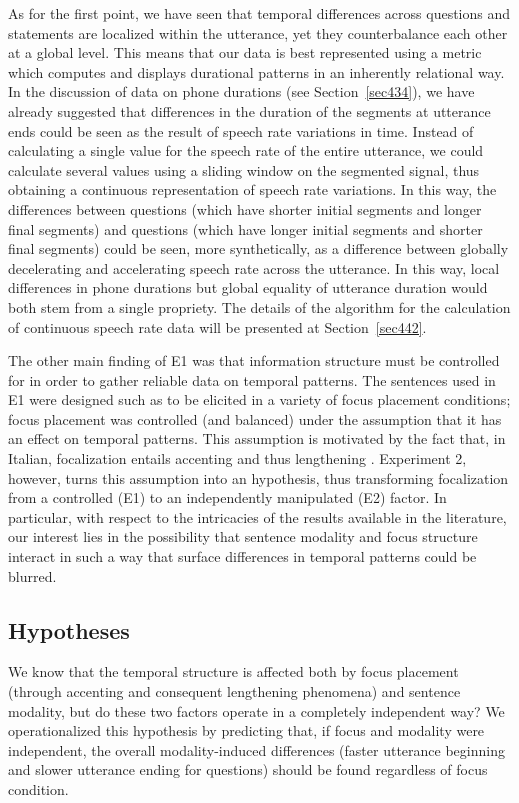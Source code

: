 As for the first point, we have seen that temporal differences across questions and statements are localized within the utterance, yet they counterbalance each other at a global level. This means that our data is best represented using a metric which computes and displays durational patterns in an inherently relational way. In the discussion of data on phone durations (see Section~\ref{sec434}), we have already suggested that differences in the duration of the segments at utterance ends could be seen as the result of speech rate variations in time. Instead of calculating a single value for the speech rate of the entire utterance, we could calculate several values using a sliding window on the segmented signal, thus obtaining a continuous representation of speech rate variations. In this way, the differences between questions (which have shorter initial segments and longer final segments) and questions (which have longer initial segments and shorter final segments) could be seen, more synthetically, as a difference between globally decelerating and accelerating speech rate across the utterance. In this way, local differences in phone durations but global equality of utterance duration would both stem from a single propriety. The details of the algorithm for the calculation of continuous speech rate data will be presented at Section~\ref{sec442}.

The other main finding of E1 was that information structure must be controlled for in order to gather reliable data on temporal patterns. The sentences used in E1 were designed such as to be elicited in a variety of focus placement conditions; focus placement was controlled (and balanced) under the assumption that it has an effect on temporal patterns. This assumption is motivated by the fact that, in Italian, focalization entails accenting and thus lengthening \citep{farnetani1990rhytmic}. Experiment 2, however, turns this assumption into an hypothesis, thus transforming focalization from a controlled (E1) to an independently manipulated (E2) factor. In particular, with respect to the intricacies of the results available in the literature, our interest lies in the possibility that sentence modality and focus structure interact in such a way that surface differences in temporal patterns could be blurred.

\subsection{Hypotheses}\label{sec441}
We know that the temporal structure is affected both by focus placement (through accenting and consequent lengthening phenomena) and sentence modality, but do these two factors operate in a completely independent way? We operationalized this hypothesis by predicting that, if focus and modality were independent, the overall modality-induced differences (faster utterance beginning and slower utterance ending for questions) should be found regardless of focus condition. 

